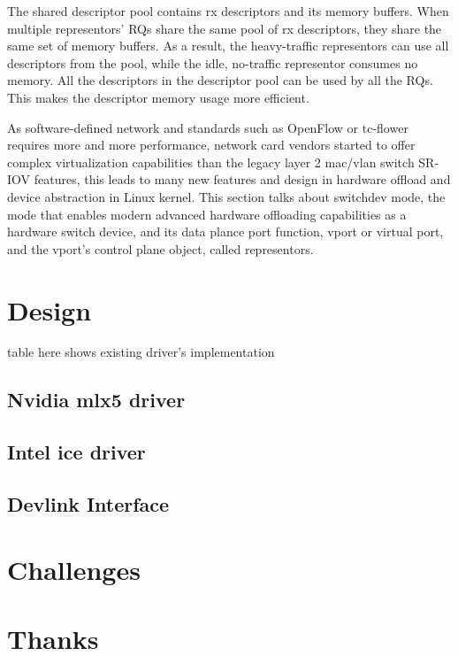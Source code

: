 \documentclass[letterpaper]{article}
\begin{document}
The shared descriptor pool contains rx descriptors and its memory
buffers. When multiple representors' RQs share the same pool of rx
descriptors, they share the same set of memory buffers. As a result,
the heavy-traffic representors can use all descriptors from the pool,
while the idle, no-traffic representor consumes no memory. All the
descriptors in the descriptor pool can be used by all the RQs. This
makes the descriptor memory usage more efficient.


As software-defined network and standards such as OpenFlow or tc-flower
requires more and more performance, network card vendors started to offer
complex virtualization capabilities than the legacy layer 2 mac/vlan switch
SR-IOV features, this leads to many new features and design in hardware offload
and device abstraction in Linux kernel.
This section talks about switchdev mode, the mode that enables
modern advanced hardware offloading capabilities as a hardware switch device,
and its data plance port function, vport or virtual port, and the vport's
control plane object, called representors.

\section{Design}
table here shows existing driver's implementation~\cite{buffersize}
\subsection{Nvidia mlx5 driver}
\subsection{Intel ice driver}
\subsection{Devlink Interface}

\section{Challenges}
\section{Thanks}
\end{document}

